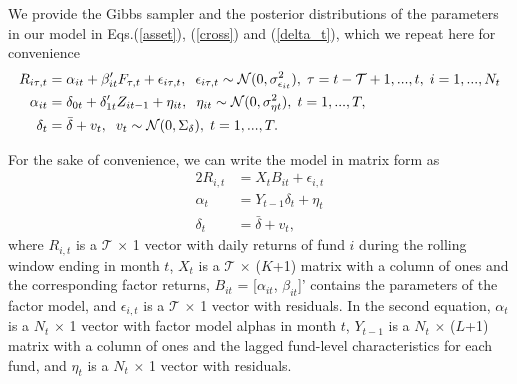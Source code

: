We provide the Gibbs sampler and the posterior distributions of the parameters in our model in Eqs.(\ref{asset}), (\ref{cross}) and (\ref{delta_t}), which we repeat here for convenience 
\begin{alignat}{2}
    R_{i\tau,t} &= \alpha_{it} + \beta_{it}'F_{\tau,t} + \epsilon_{i\tau,t}, \hspace{0.2cm} \epsilon_{i\tau,t} \sim \mathcal{N}(0,\sigma^2_{\epsilon_{it}}), \hspace{0.1cm} \tau = t-\mathcal{T}+1,...,t,
\hspace{0.1cm} i = 1,...,N_t \\
    \alpha_{it} &= \delta_{0t} + \delta_{1t}'Z_{it-1} + \eta_{it}, \hspace{0.2cm} \eta_{it} \sim \mathcal{N}(0,\sigma^2_{\eta t}), \hspace{0.1cm} t = 1,...,T, \\ 
    \delta_t &= \bar{\delta} + v_t, \hspace{0.2cm} v_t \sim \mathcal{N}(0,\Sigma_{\delta}), \hspace{0.1cm} t = 1,...,T.
\end{alignat}

For the sake of convenience, we can write the model in matrix form as 
\begin{alignat}{2}
    R_{i,t} &= X_tB_{it} + \epsilon_{i,t}  \\
    \alpha_{t} &= Y_{t-1}\delta_t + \eta_{t} \\ 
     \delta_t &= \bar{\delta} + v_t,
\end{alignat}
where $R_{i,t}$ is a $\mathcal{T}$ $\times$ 1 vector with daily returns of fund $i$ during the rolling window ending in month $t$, $X_t$ is a $\mathcal{T}$ $\times$ ($K$+1) matrix with a column of ones and the corresponding factor returns, $B_{it}$ = [$\alpha_{it}$, $\beta_{it}$]' contains the parameters of the factor model, and $\epsilon_{i,t}$ is a $\mathcal{T}$ $\times$ 1 vector with residuals. In the second equation, $\alpha_t$ is a $N_t$ $\times$ 1 vector with factor model alphas in month $t$, $Y_{t-1}$ is a $N_t$ $\times$ ($L$+1) matrix with a column of ones and the lagged fund-level characteristics for each fund, and $\eta_t$ is a $N_t$ $\times$ 1 vector with residuals. 

